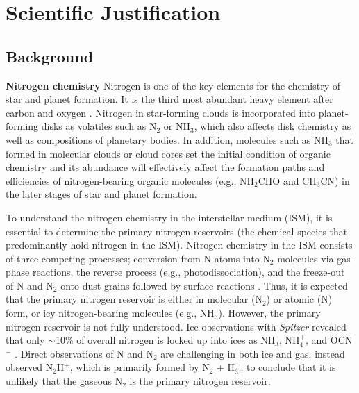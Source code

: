 \documentclass[12pt,a4paper]{article}  %
\newcommand{\ammonia}{NH$_3$\xspace}
\begin{document}
\pagestyle{plain}
 



\section{Scientific Justification}
\subsection{Background}
\noindent \textbf{Nitrogen chemistry} \quad Nitrogen is one of the key elements for the chemistry of star and planet formation. It is the third most abundant heavy element after carbon and oxygen \citep{Przybilla08}. Nitrogen in star-forming clouds is incorporated into planet-forming disks as volatiles such as N$_2$ or NH$_3$, which also affects disk chemistry \citep[e.g.,][]{Schwarz14} as well as compositions of planetary bodies. %
In addition, molecules such as \ammonia that formed in molecular clouds or cloud cores set the initial condition of organic chemistry and its abundance will effectively affect the formation paths and efficiencies of nitrogen-bearing organic molecules (e.g., NH$_2$CHO and CH$_3$CN) in the later stages of star and planet formation.

To understand the nitrogen chemistry in the interstellar medium (ISM), it is essential to determine the primary nitrogen reservoirs (the chemical species that predominantly hold nitrogen in the ISM). Nitrogen chemistry in the ISM consists of three competing processes; conversion from N atoms into N$_2$ molecules via gas-phase reactions, the reverse process (e.g., photodissociation), and the freeze-out of N and N$_2$ onto dust grains followed by surface reactions \citep[e.g.,][]{Daranlot12}. Thus, it is expected that the primary nitrogen reservoir is either in molecular (N$_2$) or atomic (N) form, or icy nitrogen-bearing molecules (e.g., \ammonia). However, the primary nitrogen reservoir is not fully understood. Ice observations with \textit{Spitzer} revealed that only $\sim$10\% of overall nitrogen is locked up into ices as \ammonia, NH$_4^+$, and OCN$^-$ \citep{Oberg11}. Direct observations of N and N$_2$ are challenging in both ice and gas. \citet{Maret06} instead observed N$_2$H$^+$, which is primarily formed by N$_2$ + H$_3^+$, to conclude that it is unlikely that the gaseous N$_2$ is the primary nitrogen reservoir.
\end{document}

